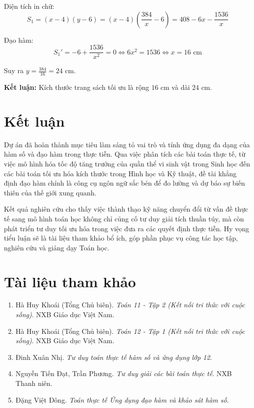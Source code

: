 \documentclass[12pt,a4paper]{article}
\begin{document}
Diện tích in chữ:
\[ S_1 = (x - 4)(y - 6) = (x - 4)\left(\frac{384}{x} - 6\right) = 408 - 6x - \frac{1536}{x} \]

Đạo hàm:
\[ S_1' = -6 + \frac{1536}{x^2} = 0 \iff 6x^2 = 1536 \iff x = 16\text{ cm} \]

Suy ra $y = \frac{384}{16} = 24\text{ cm}$.

\noindent\textbf{Kết luận:} Kích thước trang sách tối ưu là rộng $16\text{ cm}$ và dài $24\text{ cm}$.

\newpage

\section*{Kết luận}

Dự án đã hoàn thành mục tiêu làm sáng tỏ vai trò và tính ứng dụng đa dạng của hàm số và đạo hàm trong thực tiễn. Qua việc phân tích các bài toán thực tế, từ việc mô hình hóa tốc độ tăng trưởng của quần thể vi sinh vật trong Sinh học đến các bài toán tối ưu hóa kích thước trong Hình học và Kỹ thuật, đề tài khẳng định đạo hàm chính là công cụ ngôn ngữ sắc bén để đo lường và dự báo sự biến thiên của thế giới xung quanh.

Kết quả nghiên cứu cho thấy việc thành thạo kỹ năng chuyển đổi từ vấn đề thực tế sang mô hình toán học không chỉ củng cố tư duy giải tích thuần túy, mà còn phát triển tư duy tối ưu hóa trong việc đưa ra các quyết định thực tiễn. Hy vọng tiểu luận sẽ là tài liệu tham khảo bổ ích, góp phần phục vụ công tác học tập, nghiên cứu và giảng dạy Toán học.

\newpage

\section*{Tài liệu tham khảo}

\begin{enumerate}
    \item Hà Huy Khoái (Tổng Chủ biên). \textit{Toán 11 - Tập 2 (Kết nối tri thức với cuộc sống)}. NXB Giáo dục Việt Nam.
    \item Hà Huy Khoái (Tổng Chủ biên). \textit{Toán 12 - Tập 1 (Kết nối tri thức với cuộc sống)}. NXB Giáo dục Việt Nam.
    \item Đinh Xuân Nhị. \textit{Tư duy toán thực tế hàm số và ứng dụng lớp 12}. 
    \item Nguyễn Tiến Đạt, Trần Phương. \textit{Tư duy giải các bài toán thực tế}. NXB Thanh niên.
    \item Đặng Việt Đông. \textit{Toán thực tế Ứng dụng đạo hàm và khảo sát hàm số}. 
\end{enumerate}
\end{document}
